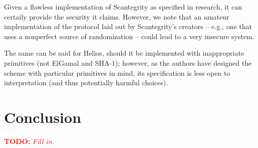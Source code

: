 \documentclass[10pt]{article}
\newcommand{\todo}[1]{\textcolor{red}{\textbf{TODO:} \emph{#1}}}
\begin{document}
\begin{multicols}{2}
Given a flawless implementation of Scantegrity as specified in research, it can certaily provide the
security it claims. However, we note that an amateur implementation of the protocol laid out by
Scantegrity's creators -- e.g., one that uses a nonperfect source of randomization -- could lead to
a very insecure system.

The same can be said for Helios, should it be implemented with inappropriate primitives (not ElGamal
and SHA-1); however, as the authors have designed the scheme with particular primitives in mind, its
specification is less open to interpretation (and thus potentially harmful choices).

\section{Conclusion}

\todo{Fill in.}




\end{multicols}
\end{document}
